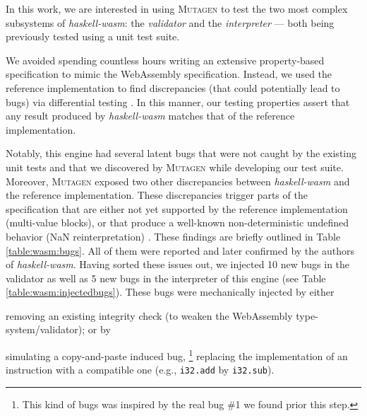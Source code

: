 \documentclass[sigconf, anonymous, review]{acmart}
\newcommand{\mutagen}{\textsc{Mutagen}\xspace}
\begin{document}
In this work, we are interested in using \mutagen to test the two most complex
subsystems of \textit{haskell-wasm}: the \emph{validator} and the
\emph{interpreter} --- both being previously tested using a unit test suite.


We avoided spending countless hours writing an extensive property-based
specification to mimic the WebAssembly specification.
%
Instead, we used the reference implementation to find discrepancies (that could
potentially lead to bugs) via differential testing
\cite{mckeeman1998differential}.
%
In this manner, our testing properties assert that any result produced by
\textit{haskell-wasm} matches that of the reference implementation.

Notably, this engine had several latent bugs that were not caught by the
existing unit tests and that we discovered by \mutagen while developing our test
suite.
%
Moreover, \mutagen exposed two other discrepancies between \textit{haskell-wasm}
and the reference implementation.
%
These discrepancies trigger parts of the specification that are either not yet
supported by the reference implementation (multi-value blocks), or that produce
a well-known non-deterministic undefined behavior (NaN reinterpretation)
\cite{perenyi2020stack}.
%
These findings are briefly outlined in Table \ref{table:wasm:bugs}.
%
All of them were reported and later confirmed by the authors of
\textit{haskell-wasm}.
%
Having sorted these issues out, we injected 10 new bugs in the validator as well
as 5 new bugs in the interpreter of this engine (see Table
\ref{table:wasm:injectedbugs}).
%
These bugs were mechanically injected by either
%
\begin{inparaenum}
\item removing an existing integrity check (to weaken the WebAssembly
  type-system/validator); or by
\item simulating a copy-and-paste induced bug,%
  \footnote{This kind of bugs was inspired by the real bug \#1 we found prior
    this step.}
  replacing the implementation of an instruction with a compatible one
  (e.g., \texttt{i32.add} by \texttt{i32.sub}).
\end{inparaenum}




\end{document}
